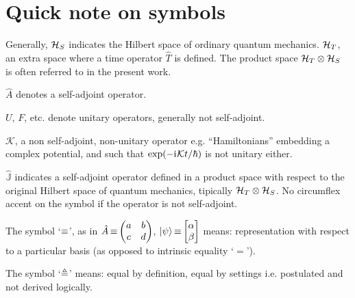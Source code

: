 \section*{Quick note on symbols}

Generally, $\mathcal{H}_S$ indicates the Hilbert space of ordinary quantum mechanics.
$\mathcal{H}_T$, an extra space where a time operator $\hat{T}$ is defined. The product space $\mathcal{H}_T \otimes \mathcal{H}_S$
is often referred to in the present work.

$\hat{A}$ denotes a self-adjoint operator.

$U$, $F$, etc. denote unitary operators, generally not self-adjoint.

$\mathcal{K}$, a non self-adjoint, non-unitary operator e.g. ``Hamiltonians'' embedding a complex potential,
and such that $\exp(-\mathrm{i}\mkern1mu \mathcal{K} t / \hbar)$ is not unitary either.

$\hat{\mathbb{J}}$ indicates a self-adjoint operator defined in a product space with respect to the original Hilbert space
of quantum mechanics, tipically $\mathcal{H}_T \otimes \mathcal{H}_S$. No circumflex accent on the symbol if the operator is not self-adjoint.

The symbol `$\operatorname*{\equiv}$', as in $\hat{A} \repr \mqty(a&b\\c&d)$, $\ket{\psi} \repr \mqty[\alpha \\ \beta]$
means: representation with respect to a particular basis (as opposed to intrinsic equality `$=$').

The symbol `$\triangleq$'
means: equal by definition, equal by settings i.e. postulated and not derived logically.
